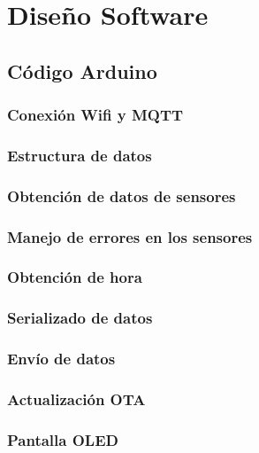 \section{Diseño Software}\label{sec:dissoft}

\subsection{Código Arduino}

\subsubsection{Conexión Wifi y MQTT}

\subsubsection{Estructura de datos}

\subsubsection{Obtención de datos de sensores}

\subsubsection{Manejo de errores en los sensores}

\subsubsection{Obtención de hora}

\subsubsection{Serializado de datos}

\subsubsection{Envío de datos}

\subsubsection{Actualización OTA}

\subsubsection{Pantalla OLED}

